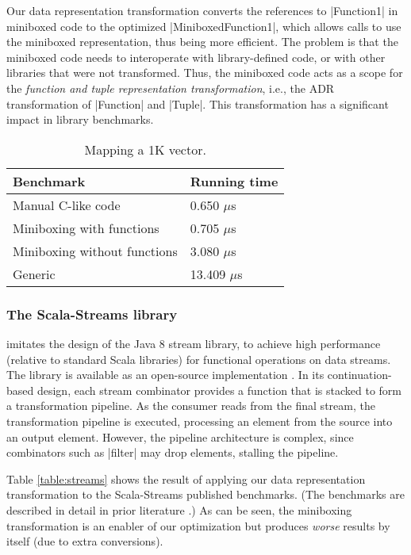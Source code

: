 Our data representation transformation converts the references to |Function1| in miniboxed code to the optimized |MiniboxedFunction1|, which allows calls to use the miniboxed representation, thus being more efficient. The problem is that the miniboxed code needs to interoperate with library-defined code, or with other libraries that were not transformed. Thus, the miniboxed code acts as a scope for the \emph{function and tuple representation transformation}, i.e., the ADR transformation of |Function| and |Tuple|. This transformation has a significant impact in library benchmarks.

\begin{table}[t]
  \begin{tabularx}{0.48\textwidth}{|g *{1}{|Y}|} \hline
    \textbf{Benchmark}             &  \textbf{Running time} \\ \hline
    Manual C-like code             &         0.650 $\mu$s \\
    Miniboxing with functions      &         0.705 $\mu$s \\
    Miniboxing without functions   &         3.080 $\mu$s \\
    Generic                        &        13.409 $\mu$s \\ \hline
  \end{tabularx}

  \caption{Mapping a 1K vector.}
  \label{table:framian}

\end{table}

\subsubsection*{The Scala-Streams library} \cite{biboudis_clash_2014} imitates the design of the Java 8 stream library, to achieve high performance (relative to standard Scala libraries) for functional operations on data streams. The library is available as an open-source implementation \cite{biboudis-streams}. In its continuation-based design, each stream combinator provides a function that is stacked to form a transformation pipeline. As the consumer reads from the final stream, the transformation pipeline is executed, processing an element from the source into an output element. However, the pipeline architecture is complex, since combinators such as |filter| may drop elements, stalling the pipeline.

Table \ref{table:streams} shows the result of applying our data
representation transformation to the Scala-Streams published
benchmarks. (The benchmarks are described in detail in prior
literature \cite{biboudis_clash_2014,biboudis_et_al:ECOOP:short}.) As can be seen, the miniboxing
transformation is an enabler of our optimization but produces
\emph{worse} results by itself (due to extra conversions).

